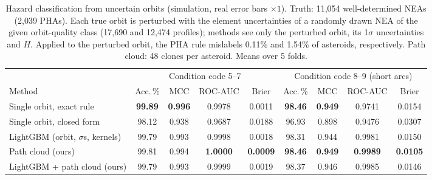 \begin{table}[t]
\centering
\footnotesize
\caption{Hazard classification from uncertain orbits (simulation, real error bars $\times1$). Truth: 11,054 well-determined NEAs (2,039 PHAs). Each true orbit is perturbed with the element uncertainties of a randomly drawn NEA of the given orbit-quality class (17,690 and 12,474 profiles); methods see only the perturbed orbit, its 1$\sigma$ uncertainties and $H$. Applied to the perturbed orbit, the PHA rule mislabels 0.11\% and 1.54\% of asteroids, respectively. Path cloud: 48 clones per asteroid. Means over 5 folds.}
\label{tab:uncertainty}
\begin{tabular}{@{}lcccccccc@{}}
\toprule
 & \multicolumn{4}{c}{Condition code 5--7} & \multicolumn{4}{c}{Condition code 8--9 (short arcs)} \\
\cmidrule(lr){2-5}\cmidrule(l){6-9}
Method & Acc.\,\% & MCC & ROC-AUC & Brier & Acc.\,\% & MCC & ROC-AUC & Brier \\
\midrule
Single orbit, exact rule & \textbf{99.89} & \textbf{0.996} & 0.9978 & 0.0011 & \textbf{98.46} & \textbf{0.949} & 0.9741 & 0.0154 \\
Single orbit, closed form & 98.12 & 0.938 & 0.9687 & 0.0188 & 96.93 & 0.898 & 0.9476 & 0.0307 \\
LightGBM (orbit, $\sigma$s, kernels) & 99.79 & 0.993 & 0.9998 & 0.0018 & 98.31 & 0.944 & 0.9981 & 0.0150 \\
Path cloud (ours) & 99.81 & 0.994 & \textbf{1.0000} & \textbf{0.0009} & \textbf{98.46} & \textbf{0.949} & \textbf{0.9989} & \textbf{0.0105} \\
LightGBM + path cloud (ours) & 99.79 & 0.993 & 0.9999 & 0.0019 & 98.37 & 0.946 & 0.9985 & 0.0146 \\
\bottomrule
\end{tabular}
\end{table}
